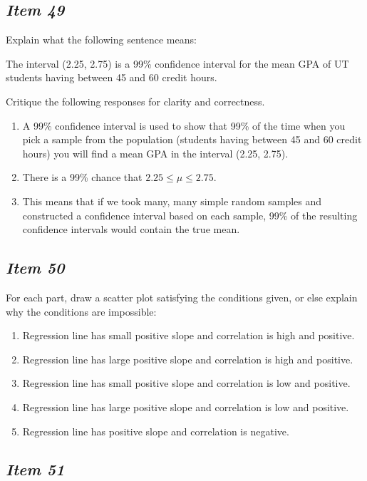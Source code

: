 \subsection{\textbf{\textit{Item 49}}}

Explain what the following sentence means:

The interval (2.25, 2.75) is a 99\% confidence interval for the mean GPA of UT students having between 45 and 60 credit hours.

Critique the following responses for clarity and correctness.

\begin{enumerate} [leftmargin=1cm, itemsep=.2em]
\item A 99\% confidence interval is used to show that 99\% of the time when you pick a sample from the population  (students having between 45 and 60 credit hours) you will find a mean GPA in the interval (2.25, 2.75).

\item 
There is a 99\% chance that $2.25 \leq \mu \leq  2.75$.

\item This means that if we took many, many simple random samples and constructed a confidence interval based on each sample,  99\% of the resulting confidence intervals would contain the true mean.
\end{enumerate}

\subsection{\textbf{\textit{Item 50}}}
For each part, draw a scatter plot satisfying the conditions given, or else explain why the conditions are impossible:
\begin{enumerate} [leftmargin=1cm, itemsep=.2em]
\item Regression line has small positive slope and correlation is high and positive.
\item Regression line has large positive slope and correlation is high and positive.
\item Regression line has small positive slope and correlation is low and positive.
\item Regression line has large positive slope and correlation is low and positive.
\item Regression line has positive slope and correlation is negative.
\end{enumerate}

\subsection{\textbf{\textit{Item 51}}}


